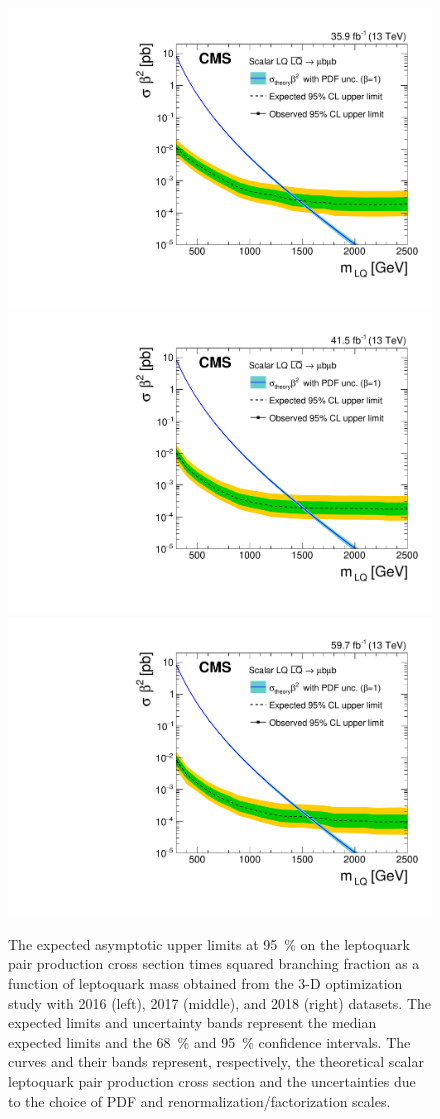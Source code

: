 \begin{figure}[H]
    \centering
    {\includegraphics[width=.32\textwidth]{Images/Analysis/3D_Opt_Limits/BR_Sigma_MuMu_2016.pdf}}
    {\includegraphics[width=.32\textwidth]{Images/Analysis/3D_Opt_Limits/BR_Sigma_MuMu_2017.pdf}}
    {\includegraphics[width=.32\textwidth]{Images/Analysis/3D_Opt_Limits/BR_Sigma_MuMu_2018.pdf}}
    \caption{The expected asymptotic upper limits at \SI{95}{\%} \CL on the leptoquark pair production cross section times squared branching fraction as a function of leptoquark mass obtained from the 3-D optimization study with 2016 (left), 2017 (middle), and 2018 (right) datasets. The expected limits and uncertainty bands represent the median expected limits and the \SI{68}{\%} and \SI{95}{\%} confidence intervals. The  curves and their bands represent, respectively, the theoretical scalar leptoquark pair production cross section and the uncertainties due to the choice of PDF and renormalization/factorization scales.}
    \label{figapp:cutandcountlimits}
\end{figure}

